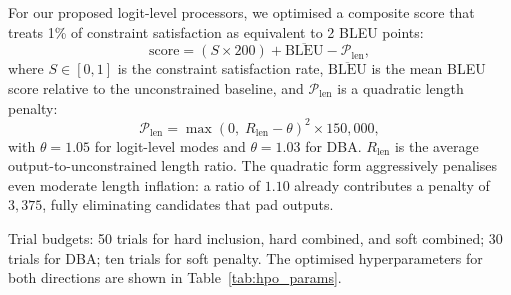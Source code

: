 \documentclass{CUP-JNL-NLP}
\begin{document}
For our proposed logit-level processors, we optimised a composite score that treats
1\% of constraint satisfaction as equivalent to 2 BLEU points:
\begin{equation}
    \text{score} = (S \times 200) + \overline{\text{BLEU}} - \mathcal{P}_{\text{len}},
    \label{eq:obj}
\end{equation}
where $S \in [0, 1]$ is the constraint satisfaction rate, $\overline{\text{BLEU}}$
is the mean BLEU score relative to the unconstrained baseline, and
$\mathcal{P}_{\text{len}}$ is a quadratic length penalty:
\begin{equation}
    \mathcal{P}_{\text{len}} = \max(0,\; R_{\text{len}} - \theta)^2 \times 150{,}000,
    \label{eq:lenpen}
\end{equation}
with $\theta = 1.05$ for logit-level modes and $\theta = 1.03$ for DBA.
$R_{\text{len}}$ is the average output-to-unconstrained length ratio. The quadratic
form aggressively penalises even moderate length inflation: a ratio of $1.10$ already
contributes a penalty of $3{,}375$, fully eliminating candidates that pad outputs.

Trial budgets: 50 trials for hard inclusion, hard combined, and soft combined; 30
trials for DBA; ten trials for soft penalty. The optimised hyperparameters for both
directions are shown in Table~\ref{tab:hpo_params}.
\end{document}
